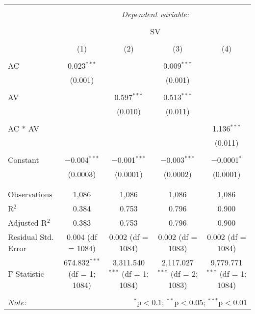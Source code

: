 
\begin{table}[!htbp] \centering 
  \caption{} 
  \label{} 
\begin{tabular}{@{\extracolsep{5pt}}lcccc} 
\\[-1.8ex]\hline 
\hline \\[-1.8ex] 
 & \multicolumn{4}{c}{\textit{Dependent variable:}} \\ 
\cline{2-5} 
\\[-1.8ex] & \multicolumn{4}{c}{SV} \\ 
\\[-1.8ex] & (1) & (2) & (3) & (4)\\ 
\hline \\[-1.8ex] 
 AC & 0.023$^{***}$ &  & 0.009$^{***}$ &  \\ 
  & (0.001) &  & (0.001) &  \\ 
  & & & & \\ 
 AV &  & 0.597$^{***}$ & 0.513$^{***}$ &  \\ 
  &  & (0.010) & (0.011) &  \\ 
  & & & & \\ 
 AC * AV &  &  &  & 1.136$^{***}$ \\ 
  &  &  &  & (0.011) \\ 
  & & & & \\ 
 Constant & $-$0.004$^{***}$ & $-$0.001$^{***}$ & $-$0.003$^{***}$ & $-$0.0001$^{*}$ \\ 
  & (0.0003) & (0.0001) & (0.0002) & (0.0001) \\ 
  & & & & \\ 
\hline \\[-1.8ex] 
Observations & 1,086 & 1,086 & 1,086 & 1,086 \\ 
R$^{2}$ & 0.384 & 0.753 & 0.796 & 0.900 \\ 
Adjusted R$^{2}$ & 0.383 & 0.753 & 0.796 & 0.900 \\ 
Residual Std. Error & 0.004 (df = 1084) & 0.002 (df = 1084) & 0.002 (df = 1083) & 0.002 (df = 1084) \\ 
F Statistic & 674.832$^{***}$ (df = 1; 1084) & 3,311.540$^{***}$ (df = 1; 1084) & 2,117.027$^{***}$ (df = 2; 1083) & 9,779.771$^{***}$ (df = 1; 1084) \\ 
\hline 
\hline \\[-1.8ex] 
\textit{Note:}  & \multicolumn{4}{r}{$^{*}$p$<$0.1; $^{**}$p$<$0.05; $^{***}$p$<$0.01} \\ 
\end{tabular} 
\end{table} 
